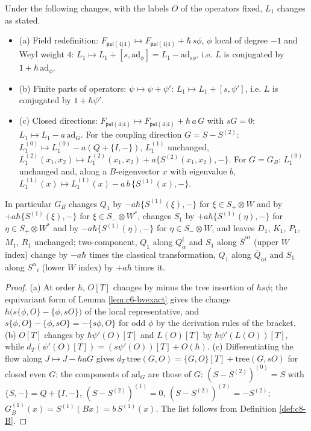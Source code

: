 \begin{proposition}
\label{prop:c8-laws}
Under the following changes, with the labels $O$ of the operators fixed, $L_1$ changes as stated.
\begin{itemize}
\item (a) Field redefinition: $F_{\mathfrak{psl}(4|4)}\mapsto F_{\mathfrak{psl}(4|4)}+\hbar\,s\phi$, $\phi$ local of degree $-1$ and Weyl weight $4$: $L_1\mapsto L_1+[s,\mathrm{ad}_\phi]=L_1-\mathrm{ad}_{s\phi}$, i.e. $L$ is conjugated by $1+\hbar\,\mathrm{ad}_\phi$.
\item (b) Finite parts of operators: $\psi\mapsto\psi+\psi'$: $L_1\mapsto L_1+[s,\psi']$, i.e. $L$ is conjugated by $1+\hbar\psi'$.
\item (c) Closed directions: $F_{\mathfrak{psl}(4|4)}\mapsto F_{\mathfrak{psl}(4|4)}+\hbar\,a\,G$ with $sG=0$: $L_1\mapsto L_1-a\,\mathrm{ad}_G$. For the coupling direction $G=S-S^{(2)}$: $L_1^{(0)}\mapsto L_1^{(0)}-a(Q+\{I,-\})$, $L_1^{(1)}$ unchanged, $L_1^{(2)}(x_1,x_2)\mapsto L_1^{(2)}(x_1,x_2)+a\{S^{(2)}(x_1,x_2),-\}$. For $G=G_B$: $L_1^{(0)}$ unchanged and, along a $B$-eigenvector $x$ with eigenvalue $b$, $L_1^{(1)}(x)\mapsto L_1^{(1)}(x)-a\,b\,\{S^{(1)}(x),-\}$.
\end{itemize}
In particular $G_B$ changes $Q_1$ by $-a\hbar\{S^{(1)}(\xi),-\}$ for $\xi\in S_+\otimes W$ and by $+a\hbar\{S^{(1)}(\xi),-\}$ for $\xi\in S_-\otimes W^*$, changes $S_1$ by $+a\hbar\{S^{(1)}(\eta),-\}$ for $\eta\in S_+\otimes W^*$ and by $-a\hbar\{S^{(1)}(\eta),-\}$ for $\eta\in S_-\otimes W$, and leaves $D_1$, $K_1$, $P_1$, $M_1$, $R_1$ unchanged; two-component, $Q_1$ along $Q^i_\alpha$ and $S_1$ along $\bar S^{\dot\alpha i}$ (upper $W$ index) change by $-a\hbar$ times the classical transformation, $Q_1$ along $\bar Q_{\dot\alpha i}$ and $S_1$ along $S^\alpha{}_i$ (lower $W$ index) by $+a\hbar$ times it.
\end{proposition}

\begin{proof}
(a) At order $\hbar$, $O[T]$ changes by minus the tree insertion of $\hbar s\phi$; the equivariant form of Lemma \ref{lem:c6-bvexact} gives the change $\hbar\big(s\{\phi,O\}-\{\phi,sO\}\big)$ of the local representative, and $s\{\phi,O\}-\{\phi,sO\}=-\{s\phi,O\}$ for odd $\phi$ by the derivation rules of the bracket. (b) $O[T]$ changes by $\hbar\psi'(O)[T]$ and $L(O)[T]$ by $\hbar\psi'(L(O))[T]$, while $d_T(\psi'(O)[T])=(s\psi'(O))[T]+O(\hbar)$. (c) Differentiating the flow along $J\mapsto J-\hbar aG$ gives $d_T\,\mathrm{tree}(G,O)=\{G,O\}[T]+\mathrm{tree}(G,sO)$ for closed even $G$; the components of $\mathrm{ad}_G$ are those of $G$: $(S-S^{(2)})^{(0)}=S$ with $\{S,-\}=Q+\{I,-\}$, $(S-S^{(2)})^{(1)}=0$, $(S-S^{(2)})^{(2)}=-S^{(2)}$; $G_B^{(1)}(x)=S^{(1)}(Bx)=b\,S^{(1)}(x)$. The list follows from Definition \ref{def:c8-B}.
\end{proof}

